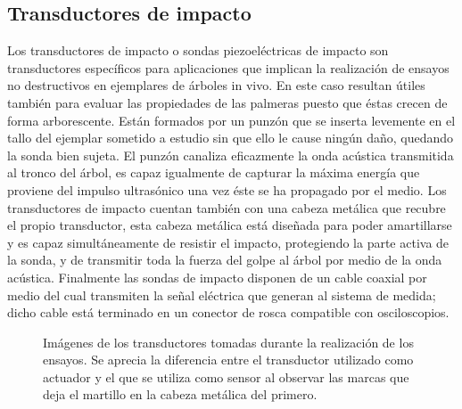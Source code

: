 \subsection{Transductores de impacto}

Los transductores de impacto o sondas piezoeléctricas de impacto son
transductores específicos para aplicaciones que implican la realización de
ensayos no destructivos en ejemplares de árboles in vivo. En este caso
resultan útiles también para evaluar las propiedades de las palmeras puesto
que éstas crecen de forma arborescente. Están formados por un punzón que se
inserta levemente en el tallo del ejemplar sometido a estudio sin que ello
le cause ningún daño, quedando la sonda bien sujeta. El punzón canaliza
eficazmente la onda acústica transmitida al tronco del árbol, es capaz
igualmente de capturar la máxima energía que proviene del impulso
ultrasónico una vez éste se ha propagado por el medio. Los transductores de
impacto cuentan también con una cabeza metálica que recubre el propio
transductor, esta cabeza metálica está diseñada para poder amartillarse y
es capaz simultáneamente de resistir el impacto, protegiendo la parte
activa de la sonda, y de transmitir toda la fuerza del golpe al árbol por
medio de la onda acústica. Finalmente las sondas de impacto disponen de un
cable coaxial por medio del cual transmiten la señal eléctrica que generan
al sistema de medida; dicho cable está terminado en un conector de rosca
compatible con osciloscopios.

\begin{figure}
    \begin{center}
	    \qquad
    \end{center}
    \caption[Transductores de impacto utilizados durante los
    ensayos]{Imágenes de los transductores tomadas durante la realización
    de los ensayos. Se aprecia la diferencia entre el transductor utilizado
    como actuador y el que se utiliza como sensor al observar las marcas
    que deja el martillo en la cabeza metálica del primero.}
    \label{fig:transducers}
\end{figure}

